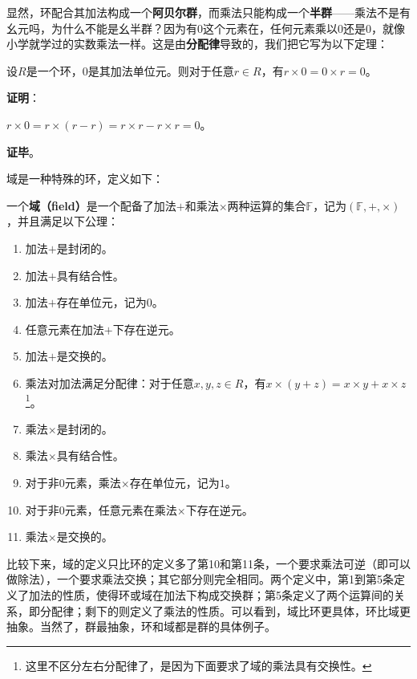 显然，环配合其加法构成一个\textbf{阿贝尔群}，而乘法只能构成一个\textbf{半群}——乘法不是有幺元吗，为什么不能是幺半群？因为有$0$这个元素在，任何元素乘以$0$还是$0$，就像小学就学过的实数乘法一样。这是由\textbf{分配律}导致的，我们把它写为以下定理：



\begin{theorem}{}
设$R$是一个环，$0$是其加法单位元。则对于任意$r\in R$，有$r\times 0=0\times r=0$。
\end{theorem}
\textbf{证明}：

$r\times 0=r\times (r-r)=r\times r-r\times r=0$。

\textbf{证毕}。

域是一种特殊的环，定义如下：

\begin{definition}{}\label{def_field_4}
一个\textbf{域（field）}是一个配备了加法$+$和乘法$\times$两种运算的集合$\mathbb{F}$，记为$(\mathbb{F}, +, \times)$，并且满足以下公理：

\begin{enumerate}
    \item 加法$+$是封闭的。
    \item 加法$+$具有结合性。
    \item 加法$+$存在单位元，记为$0$。
    \item 任意元素在加法$+$下存在逆元。
    \item 加法$+$是交换的。
    \item 乘法对加法满足分配律：对于任意$x, y, z\in R$，有$x\times(y+z)=x\times y+x\times z$\footnote{这里不区分左右分配律了，是因为下面要求了域的乘法具有交换性。}。
    \item 乘法$\times$是封闭的。
    \item 乘法$\times$具有结合性。
    \item 对于非$0$元素，乘法$\times$存在单位元，记为$1$。
    \item 对于非$0$元素，任意元素在乘法$\times$下存在逆元。
    \item 乘法$\times$是交换的。
\end{enumerate}
\end{definition}


比较下来，域的定义只比环的定义多了第10和第11条，一个要求乘法可逆（即可以做除法），一个要求乘法交换；其它部分则完全相同。两个定义中，第1到第5条定义了加法的性质，使得环或域在加法下构成交换群；第5条定义了两个运算间的关系，即分配律；剩下的则定义了乘法的性质。可以看到，域比环更具体，环比域更抽象。当然了，群最抽象，环和域都是群的具体例子。

